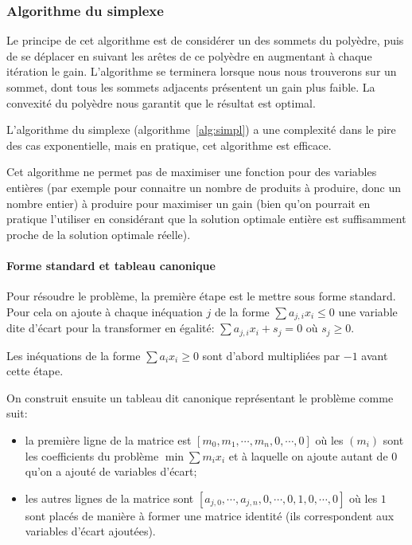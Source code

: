   \subsubsection{Algorithme du simplexe}
    Le principe de cet algorithme est de considérer un des sommets du polyèdre,
    puis de se déplacer en suivant les arêtes de ce polyèdre en augmentant à
    chaque itération le gain. L'algorithme se terminera lorsque nous nous 
    trouverons sur un sommet, dont tous les sommets adjacents présentent un gain
    plus faible. La convexité du polyèdre nous garantit que le résultat est 
    optimal.

    L'algorithme du simplexe (algorithme~\ref{alg:simpl}) a une complexité dans
    le pire des cas exponentielle, mais en pratique, cet algorithme est
    efficace.
    
    Cet algorithme ne permet pas de maximiser une fonction pour des variables
    entières (par exemple pour connaitre un nombre de produits à produire, donc
    un nombre entier) à produire pour maximiser un gain (bien qu'on pourrait en
    pratique l'utiliser en considérant que la solution optimale entière est
    suffisamment proche de la solution optimale réelle).

    \paragraph{Forme standard et tableau canonique}
      Pour résoudre le problème, la première étape est le mettre sous forme
      standard. Pour cela on ajoute à chaque inéquation $j$ de la forme
      $\sum a_{j,i}x_i \leq 0$ une variable dite d'écart pour la transformer en
      égalité: $\sum a_{j,i}x_i + s_j = 0$ où $s_j \geq 0$.
      
      Les inéquations de la forme $\sum a_ix_i \geq 0$ sont d'abord multipliées
      par $-1$ avant cette étape.

      On construit ensuite un tableau dit canonique représentant le problème
      comme suit:
      \begin{itemize}
        \item la première ligne de la matrice est
          $[m_0, m_1, \cdots, m_n, 0, \cdots, 0]$ où les $(m_i)$ sont les
          coefficients du problème $\min \sum m_ix_i$ et à laquelle on ajoute
          autant de $0$ qu'on a ajouté de variables d'écart;
        \item les autres lignes de la matrice sont
          $[a_{j,0}, \cdots, a_{j,n}, 0, \cdots, 0, 1,0, \cdots, 0]$ où les $1$
          sont placés de manière à former une matrice identité (ils
          correspondent aux variables d'écart ajoutées).
      \end{itemize}

